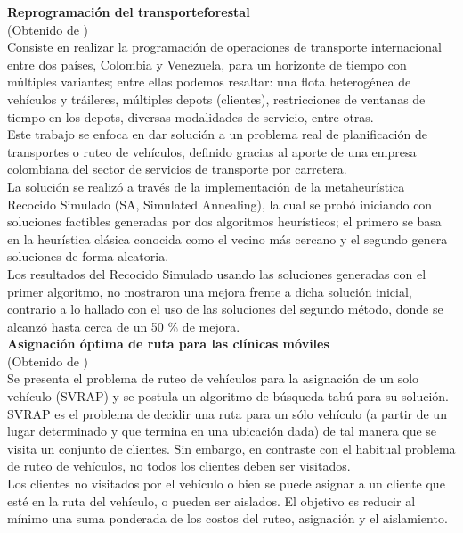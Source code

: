 \textbf{Reprogramación del transporteforestal}\\
(Obtenido de \cite{[PEMBERTHY]})\\
Consiste en realizar la programación de operaciones de transporte internacional entre dos países, Colombia y Venezuela, para un horizonte de tiempo con múltiples variantes; entre ellas podemos resaltar: una flota heterogénea de vehículos y tráileres, múltiples depots (clientes), restricciones de ventanas de tiempo en los depots, diversas modalidades de servicio, entre otras. \\
Este trabajo se enfoca en dar solución a un problema real de planificación de transportes o ruteo de vehículos, definido gracias al aporte de una empresa colombiana del sector de servicios de transporte por carretera.\\
La solución se realizó a través de la implementación de la metaheurística Recocido Simulado (SA, Simulated Annealing), la cual se probó iniciando con soluciones factibles generadas por dos algoritmos heurísticos; el primero se basa en la heurística clásica conocida como el vecino más cercano y el segundo genera soluciones de forma aleatoria. \\
Los resultados del Recocido Simulado usando las soluciones generadas con el primer algoritmo, no mostraron una mejora frente a dicha solución inicial, contrario a lo hallado con el uso de las soluciones del segundo método, donde se alcanzó hasta cerca de un 50 \%  de mejora.\\

\textbf{Asignación óptima de ruta para las clínicas móviles}\\
(Obtenido de \cite{[CONTARDO]})\\
Se presenta el problema de ruteo de vehículos para la asignación de un solo vehículo (SVRAP) y se postula un algoritmo de búsqueda tabú para su solución.\\
SVRAP es el problema de decidir una ruta para un sólo vehículo (a partir de un lugar determinado y que termina en una ubicación dada) de tal manera que se visita un conjunto de clientes. Sin embargo, en contraste con el habitual problema de ruteo de vehículos, no todos los clientes deben ser visitados. \\
Los clientes no visitados por el vehículo o bien se puede asignar a un cliente que esté en la ruta del vehículo, o pueden ser aislados. El objetivo es reducir al mínimo una suma ponderada de los costos del ruteo, asignación y el aislamiento. 



